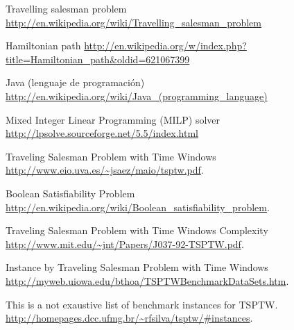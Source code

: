 \documentclass[journal, a4paper]{IEEEtran}
\begin{document}
\begin{thebibliography}{5}
Travelling salesman problem
\url{http://en.wikipedia.org/wiki/Travelling_salesman_problem}

Hamiltonian path
\url{http://en.wikipedia.org/w/index.php?title=Hamiltonian_path&oldid=621067399}

Java (lenguaje de programación)
\url{http://en.wikipedia.org/wiki/Java_(programming_language)}

Mixed Integer Linear Programming (MILP) solver
\url{http://lpsolve.sourceforge.net/5.5/index.html}

Traveling Salesman Problem with Time Windows
\url{http://www.eio.uva.es/~jsaez/maio/tsptw.pdf}.

Boolean Satisfiability Problem
\url{http://en.wikipedia.org/wiki/Boolean_satisfiability_problem}.

Traveling Salesman Problem with Time Windows Complexity
\url{http://www.mit.edu/~jnt/Papers/J037-92-TSPTW.pdf}.

Instance by Traveling Salesman Problem with Time Windows
\url{http://myweb.uiowa.edu/bthoa/TSPTWBenchmarkDataSets.htm}.

This is a not exaustive list of benchmark instances for TSPTW.
\url{http://homepages.dcc.ufmg.br/~rfsilva/tsptw/#instances}.	
\end{thebibliography}

\end{document}
